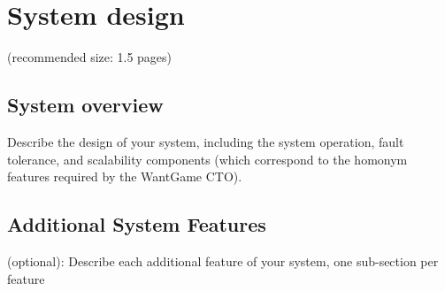 \section{System design}
(recommended size: 1.5 pages)

\subsection{System overview}
Describe the design of your system, including the system
operation, fault tolerance, and scalability components (which correspond to the
homonym features required by the WantGame CTO).

\subsection{Additional System Features}
(optional): Describe each additional feature of your system, one sub-section per feature
 